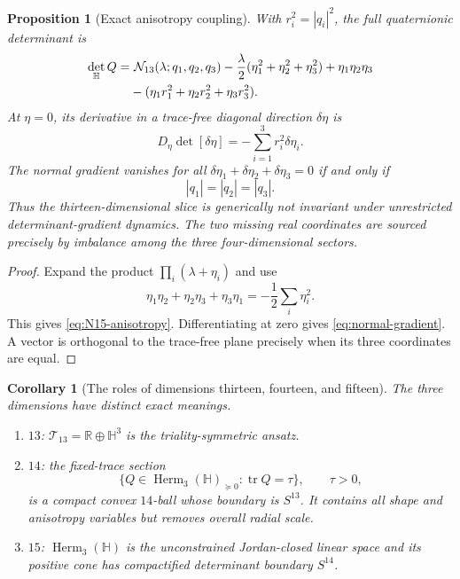 \documentclass[11pt]{article}
\newtheorem{proposition}[theorem]{Proposition}
\newtheorem{corollary}[theorem]{Corollary}
\theoremstyle{definition}
\theoremstyle{remark}
\newcommand{\R}{\mathbb R}
\newcommand{\Hh}{\mathbb H}
\newcommand{\Herm}{\operatorname{Herm}}
\newcommand{\tr}{\operatorname{tr}}
\newcommand{\cT}{\mathcal T}
\newcommand{\cN}{\mathcal N}
\begin{document}
\begin{proposition}[Exact anisotropy coupling]\label{prop:anisotropy}
With $r_i^2=|q_i|^2$, the full quaternionic determinant is
\begin{align}\label{eq:N15-anisotropy}
 \det_{\Hh}Q
 =&\ \cN_{13}(\lambda;q_1,q_2,q_3)
 -\frac{\lambda}{2}(\eta_1^2+\eta_2^2+\eta_3^2)
 +\eta_1\eta_2\eta_3\notag\\
 &-(\eta_1r_1^2+\eta_2r_2^2+\eta_3r_3^2).
\end{align}
At $\eta=0$, its derivative in a trace-free diagonal direction $\delta\eta$ is
\begin{equation}\label{eq:normal-gradient}
 D_\eta\det[\delta\eta]
 =-\sum_{i=1}^3r_i^2\delta\eta_i.
\end{equation}
The normal gradient vanishes for all $\delta\eta_1+\delta\eta_2+\delta\eta_3=0$ if and only if
\begin{equation}\label{eq:equal-norm-condition}
 |q_1|=|q_2|=|q_3|.
\end{equation}
Thus the thirteen-dimensional slice is generically not invariant under unrestricted determinant-gradient dynamics.  The two missing real coordinates are sourced precisely by imbalance among the three four-dimensional sectors.
\end{proposition}

\begin{proof}
Expand the product $\prod_i(\lambda+\eta_i)$ and use
\[
 \eta_1\eta_2+\eta_2\eta_3+\eta_3\eta_1
 =-\frac12\sum_i\eta_i^2.
\]
This gives \eqref{eq:N15-anisotropy}.  Differentiating at zero gives \eqref{eq:normal-gradient}.  A vector is orthogonal to the trace-free plane precisely when its three coordinates are equal.
\end{proof}

\begin{corollary}[The roles of dimensions thirteen, fourteen, and fifteen]\label{cor:dimensions}
The three dimensions have distinct exact meanings.
\begin{enumerate}
\item $13$: $\cT_{13}=\R\oplus\Hh^3$ is the triality-symmetric ansatz.
\item $14$: the fixed-trace section
\[
 \{Q\in\Herm_3(\Hh)_{\succeq0}:\tr Q=\tau\},\qquad\tau>0,
\]
is a compact convex $14$-ball whose boundary is $S^{13}$.  It contains all shape and anisotropy variables but removes overall radial scale.
\item $15$: $\Herm_3(\Hh)$ is the unconstrained Jordan-closed linear space and its positive cone has compactified determinant boundary $S^{14}$.
\end{enumerate}
\end{corollary}
\end{document}
